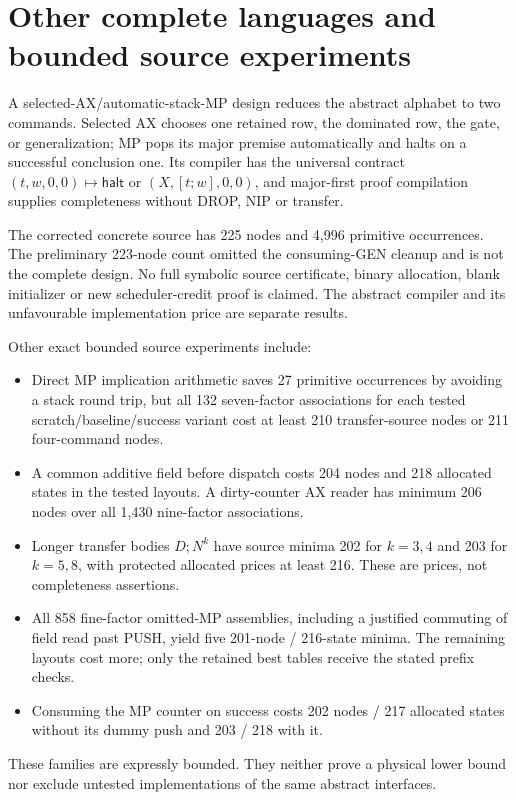 \documentclass[11pt]{article}
\begin{document}
\section{Other complete languages and bounded source experiments}
A selected-AX/automatic-stack-MP design reduces the abstract alphabet to two commands. Selected AX chooses one retained row, the dominated row, the gate, or generalization; MP pops its major premise automatically and halts on a successful conclusion one. Its compiler has the universal contract $(t,w,0,0)\mapsto\mathsf{halt}$ or $(X,[t;w],0,0)$, and major-first proof compilation supplies completeness without DROP, NIP or transfer.

The corrected concrete source has 225 nodes and 4,996 primitive occurrences. The preliminary 223-node count omitted the consuming-GEN cleanup and is not the complete design. No full symbolic source certificate, binary allocation, blank initializer or new scheduler-credit proof is claimed. The abstract compiler and its unfavourable implementation price are separate results.

Other exact bounded source experiments include:
\begin{itemize}
\item Direct MP implication arithmetic saves 27 primitive occurrences by avoiding a stack round trip, but all 132 seven-factor associations for each tested scratch/baseline/success variant cost at least 210 transfer-source nodes or 211 four-command nodes.
\item A common additive field before dispatch costs 204 nodes and 218 allocated states in the tested layouts. A dirty-counter AX reader has minimum 206 nodes over all 1,430 nine-factor associations.
\item Longer transfer bodies $D;N^k$ have source minima 202 for $k=3,4$ and 203 for $k=5,8$, with protected allocated prices at least 216. These are prices, not completeness assertions.
\item All 858 fine-factor omitted-MP assemblies, including a justified commuting of field read past PUSH, yield five 201-node / 216-state minima. The remaining layouts cost more; only the retained best tables receive the stated prefix checks.
\item Consuming the MP counter on success costs 202 nodes / 217 allocated states without its dummy push and 203 / 218 with it.
\end{itemize}
These families are expressly bounded. They neither prove a physical lower bound nor exclude untested implementations of the same abstract interfaces.
\end{document}
